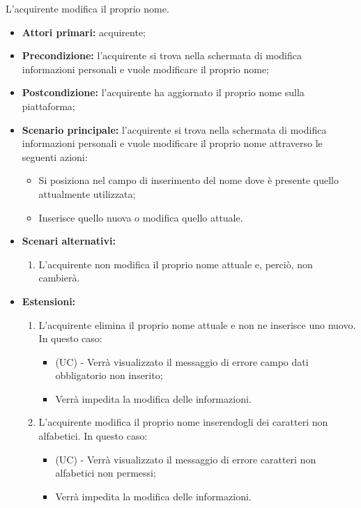 \resetSubUC

L'acquirente modifica il proprio nome.
\begin{itemize}
    \item \textbf{Attori primari:} acquirente;
    \item \textbf{Precondizione:} l'acquirente si trova nella schermata di modifica informazioni personali e vuole modificare il proprio nome;
    \item \textbf{Postcondizione:} l'acquirente ha aggiornato il proprio nome sulla piattaforma;
    \item \textbf{Scenario principale:} l'acquirente si trova nella schermata di modifica informazioni personali e vuole modificare il proprio nome attraverso le seguenti azioni:
        \begin{itemize}
            \item Si posiziona nel campo di inserimento del nome dove è presente quello attualmente utilizzata;
            \item Inserisce quello nuova o modifica quello attuale.
        \end{itemize}
    \item \textbf{Scenari alternativi:} 
    \begin{enumerate}[label=\lett]
        \item L'acquirente non modifica il proprio nome attuale e, perciò, non cambierà.
    \end{enumerate}
    \item \textbf{Estensioni:} 
    \begin{enumerate}[label=\lett]
        \item L'acquirente elimina il proprio nome attuale e non ne inserisce uno nuovo. In questo caso:
        \begin{itemize}
            \item (UC) - Verrà visualizzato il messaggio di errore campo dati obbligatorio non inserito;
            \item Verrà impedita la modifica delle informazioni.
        \end{itemize}
        \item L'acquirente modifica il proprio nome inserendogli dei caratteri non alfabetici. In questo caso:
        \begin{itemize}
            \item (UC) - Verrà visualizzato il messaggio di errore caratteri non alfabetici non permessi;
            \item Verrà impedita la modifica delle informazioni.
        \end{itemize}
    \end{enumerate}
\end{itemize}

